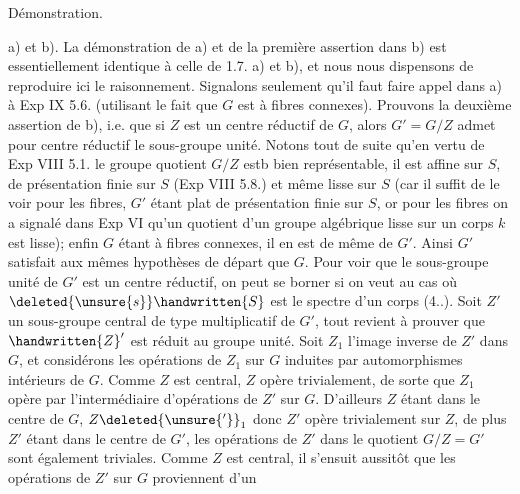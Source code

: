 Démonstration.

a) et b). La démonstration de a) et de la première assertion dans b) est essentiellement identique à celle de 1.7. a) et b), et nous nous dispensons de reproduire ici le raisonnement. Signalons seulement qu'il faut faire appel dans a) à Exp IX 5.6. (utilisant le fait que $G$ est à fibres connexes). Prouvons la deuxième assertion de b), i.e. que si $Z$ est un centre réductif de $G$, alors $G'=G/Z$ admet pour centre réductif le sous-groupe unité.
Notons tout de suite qu'en vertu de Exp VIII 5.1. le groupe quotient $G/Z$ estb bien représentable, il est affine sur $S$, de présentation finie sur $S$ (Exp VIII 5.8.) et même lisse sur $S$ (car il suffit de le voir pour les fibres, $G'$ étant plat de présentation finie sur $S$, or pour les fibres  on a signalé dans Exp VI qu'un quotient d'un groupe algébrique lisse sur un corps $k$ est lisse); enfin $G$ étant à fibres connexes, il en est de même de $G'$. Ainsi $G'$ satisfait aux mêmes hypothèses de départ que $G$.
Pour voir que le sous-groupe unité de $G'$ est un centre réductif, on peut se borner si on veut au cas où $\deleted{\unsure{s}}\handwritten{S}$ est le spectre d'un corps (4..). Soit $Z'$ un sous-groupe central de type multiplicatif de $G'$, tout revient à prouver que $\handwritten{Z}'$ est réduit au groupe unité. Soit $Z_{1}$  l'image inverse de $Z'$ dans $G$, et considérons les opérations de $Z_{1}$ sur $G$ induites par automorphismes intérieurs de $G$. Comme $Z$ est central, $Z$ opère  trivialement, de sorte que $Z_{1}$ opère par l'intermédiaire d'opérations de $Z'$ sur $G$.
D'ailleurs $Z$ étant dans le centre de $G$, $Z\deleted{\unsure{'}}_{1}$ donc $Z'$ opère trivialement sur $Z$, de plus $Z'$ étant dans le centre de $G'$, les opérations de $Z'$ dans le quotient $G/Z=G'$ \handwritten{\unsure{/|(}}sont également triviales. Comme $Z$ est central, il s'ensuit aussitôt que les opérations de $Z'$ sur $G$ proviennent d'un
